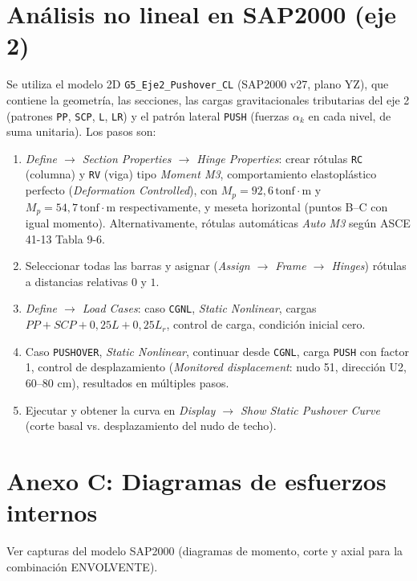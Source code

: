 \documentclass[11pt,letterpaper]{article}
\newcommand{\tonfm}{\,\mathrm{tonf\cdot m}}
\begin{document}
\section{Análisis no lineal en SAP2000 (eje 2)}
Se utiliza el modelo 2D \texttt{G5\_Eje2\_Pushover\_CL} (SAP2000 v27, plano YZ), que contiene la geometría, las secciones,
las cargas gravitacionales tributarias del eje 2 (patrones \texttt{PP}, \texttt{SCP}, \texttt{L}, \texttt{LR})
y el patrón lateral \texttt{PUSH} (fuerzas $\alpha_k$ en cada nivel, de suma unitaria). Los pasos son:
\begin{enumerate}
  \item \emph{Define $\rightarrow$ Section Properties $\rightarrow$ Hinge Properties}: crear rótulas
        \texttt{RC} (columna) y \texttt{RV} (viga) tipo \emph{Moment M3}, comportamiento elastoplástico perfecto
        (\emph{Deformation Controlled}), con $M_p = 92{,}6\tonfm$ y
        $M_p = 54{,}7\tonfm$ respectivamente, y meseta horizontal (puntos B--C con igual momento).
        Alternativamente, rótulas automáticas \emph{Auto M3} según ASCE 41-13 Tabla 9-6.
  \item Seleccionar todas las barras y asignar (\emph{Assign $\rightarrow$ Frame $\rightarrow$ Hinges}) rótulas a
        distancias relativas $0$ y $1$.
  \item \emph{Define $\rightarrow$ Load Cases}: caso \texttt{CGNL}, \emph{Static Nonlinear}, cargas
        $PP + SCP + 0{,}25L + 0{,}25L_r$, control de carga, condición inicial cero.
  \item Caso \texttt{PUSHOVER}, \emph{Static Nonlinear}, continuar desde \texttt{CGNL}, carga \texttt{PUSH} con
        factor 1, control de desplazamiento (\emph{Monitored displacement}: nudo 51, dirección U2, $60$--$80$ cm),
        resultados en múltiples pasos.
  \item Ejecutar y obtener la curva en \emph{Display $\rightarrow$ Show Static Pushover Curve} (corte basal vs.
        desplazamiento del nudo de techo).
\end{enumerate}

\section*{Anexo C: Diagramas de esfuerzos internos}
Ver capturas del modelo SAP2000 (diagramas de momento, corte y axial para la combinación ENVOLVENTE).
\end{document}
